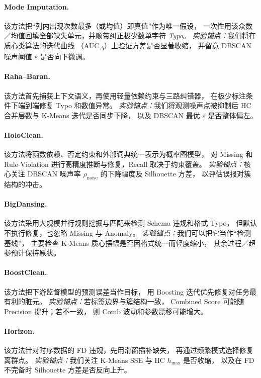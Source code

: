 \documentclass[10pt]{article} %
\numberwithin{equation}{section}
\begin{document}
\paragraph{Mode Imputation.}
该方法把“列内出现次数最多（或均值）即真值”作为唯一假设，  
一次性用该众数／均值回填全部缺失单元，并顺带纠正极少数单字符 \textit{Typo}。  
\emph{实验锚点：}我们将在质心类算法的迭代曲线
（AUC\textsubscript{$\Delta$}）上验证方差是否显著收缩，
并留意 DBSCAN 噪声阈值 $\varepsilon$ 是否向下微调。

\paragraph{Raha--Baran\cite{10.14778/3407790.3407801}.}
该方法首先捕获上下文语义，再使用轻量依赖约束与三路纠错器，
在极少标注条件下端到端修复 Typo 和数值异常。  
\emph{实验锚点：}我们将观测噪声点被抑制后
HC 合并层数与 K-Means 迭代是否同步下降，
以及 DBSCAN 最优 $\varepsilon$ 是否整体偏左。

\paragraph{HoloClean\cite{Rekatsinas2017}.}
该方法将函数依赖、否定约束和外部词典统一表示为概率图模型，
对 Missing 和 Rule‐Violation 进行高精度推断与修复，Recall 取决于约束覆盖。  
\emph{实验锚点：}核心关注 DBSCAN 噪声率
$\rho_{\text{noise}}$ 的下降幅度及 Silhouette 方差，
以评估误报对簇结构的冲击。

\paragraph{BigDansing\cite{Khayyat2015BigDansing}.}
该方法采用大规模并行规则挖掘与匹配来检测 Schema 违规和格式 Typo，
但默认不执行修复，也忽略 Missing 与 Anomaly。  
\emph{实验锚点：}我们可以把它当作“检测基线”，
主要检查 K-Means 质心摆幅是否因格式统一而轻度缩小，
其余过程／超参预计保持原状。

\paragraph{BoostClean\cite{Krishnan2017BoostClean}.}
该方法把下游监督模型的预测误差当作目标，
用 Boosting 迭代优先修复对任务最有利的脏元。  
\emph{实验锚点：}若标签边界与簇结构一致，
Combined Score 可能随 Precision 提升；若不一致，
则 $\mathrm{Comb}$ 波动和参数漂移可能增大。

\paragraph{Horizon\cite{10.14778/3476249.3476301}.}
该方法针对时序数据的 FD 违规，先用滑窗插补缺失，
再通过频繁模式选择修复离群点。  
\emph{实验锚点：}我们关注 K-Means SSE 与 HC $h_{\max}$ 是否收缩，
以及在 FD 不完备时 Silhouette 方差是否反向上升。
\end{document}
